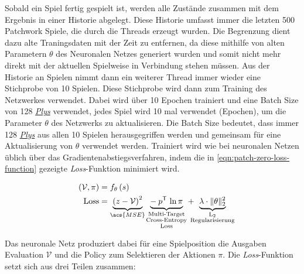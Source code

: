 Sobald ein Spiel fertig gespielt ist, werden alle Zustände zusammen mit dem Ergebnis in einer Historie abgelegt. Diese Historie umfasst immer die letzten 500 Patchwork Spiele, die durch die Threads erzeugt wurden. Die Begrenzung dient dazu alte Traningsdaten mit der Zeit zu entfernen, da diese mithilfe von alten Parametern $\theta$ des Neuronalen Netzes generiert wurden und somit nicht mehr direkt mit der aktuellen Spielweise in Verbindung stehen müssen. Aus der Historie an Spielen nimmt dann ein weiterer Thread immer wieder eine Stichprobe von 10 Spielen. Diese Stichprobe wird dann zum Training des Netzwerkes verwendet. Dabei wird über 10 Epochen trainiert und eine Batch Size von 128 \hyperref[text:ply]{\emph{Plys}} verwendet, \dash jedes Spiel wird 10 mal verwendet (Epochen), um die Parameter $\theta$ des Netzwerks zu aktualisieren. Die Batch Size bedeutet, dass immer 128 \hyperref[text:ply]{\emph{Plys}} aus allen 10 Spielen herausgegriffen werden und gemeinsam für eine Aktualisierung von $\theta$ verwendet werden.  Trainiert wird wie bei neuronalen Netzen üblich über das Gradientenabstiegsverfahren, indem die in \ref{eqn:patch-zero-loss-function} gezeigte \emph{Loss}-Funktion minimiert wird.

\begin{align}
    \label{eqn:patch-zero-network-output}
    (\mathcal{V}, \pi) &= f_\theta\left(s\right) \\
    \label{eqn:patch-zero-loss-function}
    \text{Loss} &= \underbrace{\left(z - \mathcal{V}\right)^2}_{\acs{MSE}}\:\,\mspace{1mu} \underbrace{-\: p^\mathsf{T}\, \ln \pi}_{\mathclap{\substack{\text{Multi-Target}\\ \text{Cross-Entropy}\\ \text{Loss}}}}\:\,\mspace{1mu} +\:\,\mspace{1mu} \underbrace{\lambda \cdot \lVert \theta\rVert _2^2}_{\mathclap{\substack{\text{L}_2 \\ \text{Regularisierung}}}}
\end{align}
\vspace*{-0.2cm}

Das neuronale Netz produziert dabei für eine Spielposition die Ausgaben Evaluation $\mathcal{V}$ und die Policy zum Selektieren der Aktionen $\pi$. Die \emph{Loss}-Funktion setzt sich aus drei Teilen zusammen:

